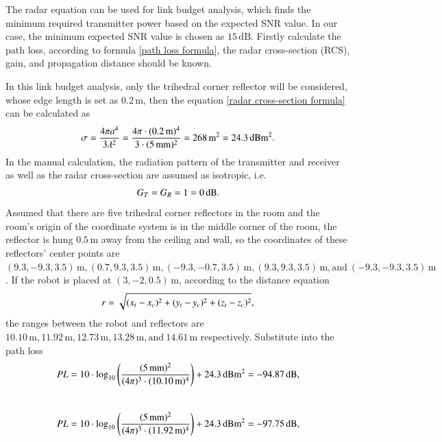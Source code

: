 \documentclass[12pt,DIV14,BCOR12mm,a4paper,footinclude=false,headinclude,parskip=half-,twoside,openright,cleardoublepage=empty,toc=index,bibliography=totoc,listof=totoc]{scrreprt}
\numberwithin{equation}{chapter}
\begin{document}
The radar equation can be used for link budget analysis, which finds the minimum required transmitter power based on the expected SNR value. In our case, the minimum expected SNR value is chosen as $15\,\mathrm{dB}$. Firstly calculate the path loss, according to formula \ref{path loss formula}, the radar cross-section (RCS), gain, and propagation distance should be known.

In this link budget analysis, only the trihedral corner reflector will be considered, whose edge length is set as $0.2\,\mathrm{m}$, then the equation \ref{radar cross-section formula} can be calculated as
\begin{equation}
    \centering
    \sigma = \frac{4 \pi a^{4}}{3 \lambda^{2}} = \frac{4\pi \cdot (0.2\,\mathrm{m})^{4}}{3\cdot (5\,\mathrm{mm})^{2}} = 268 \,\mathrm{m^2} = 24.3 \,\mathrm{dBm^2}.
\end{equation}
In the manual calculation, the radiation pattern of the transmitter and receiver as well as the radar cross-section are assumed as isotropic, i.e.
\begin{equation}
    \centering
    G_{T} = G_{R} = 1 = 0\,\mathrm{dB}.
    \label{gain of the isotropic antenna equation}
\end{equation}
Assumed that there are five trihedral corner reflectors in the room and the room's origin of the coordinate system is in the middle corner of the room, the reflector is hung $0.5\,\mathrm{m}$ away from the ceiling and wall, so the coordinates of these reflectors' center points are $(9.3, -9.3, 3.5)\,\mathrm{m}, (0.7, 9.3, 3.5)\,\mathrm{m}, (-9.3, -0.7, 3.5)\,\mathrm{m}, (9.3, 9.3, 3.5)\,\mathrm{m}, \text{and}\ (-9.3, -9.3, 3.5)\,\mathrm{m}$. If the robot is placed at $(3, -2, 0.5)\,\mathrm{m}$, according to the distance equation
\begin{equation}
    \centering
    r = \sqrt{(x_{t}-x_{c})^{2} + (y_{t}-y_{c})^{2} + (z_{t}-z_{c})^{2}},
    \label{distance formula}
\end{equation}
the ranges between the robot and reflectors are $10.10\,\mathrm{m}, 11.92\,\mathrm{m}, 12.73\,\mathrm{m}, 13.28\,\mathrm{m}, \text{and}\ 14.61\,\mathrm{m}$ respectively. Substitute into the path loss
\begin{equation}
    \centering
    PL = 10\cdot\log_{10}\left(\frac{(5\,\mathrm{mm})^{2}}{(4\pi)^{3} \cdot (10.10\,\mathrm{m})^{4}}\right) + 24.3\,\mathrm{dBm^2} = -94.87\,\mathrm{dB},
\end{equation}\\
\begin{equation}
    \centering
    PL = 10\cdot\log_{10}\left(\frac{(5\,\mathrm{mm})^{2}}{(4\pi)^{3} \cdot (11.92\,\mathrm{m})^{4}}\right) + 24.3\,\mathrm{dBm^2} = -97.75\,\mathrm{dB},
\end{equation}\\
\end{document}
